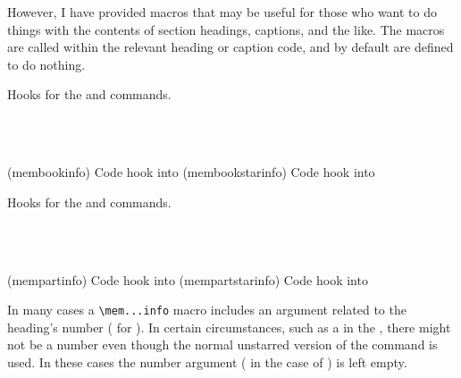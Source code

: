     However, I have provided macros that may be useful for those 
who want to do things with the contents of section headings, 
captions, and the like. The macros are called within the 
relevant heading or caption code, and by default are defined 
to do nothing.

    Hooks for the \cmd{\book} and \cmd{\book*} commands.
\begin{syntax}
\cmd{\membookinfo} \\
\cmd{\membookstarinfo} \\
\end{syntax}
\glossary(membookinfo)%
  {}%
  {Code hook into }%
\glossary(membookstarinfo)%
  {}%
  {Code hook into }%


    Hooks for the \cmd{\part} and \cmd{\part*} commands.
\begin{syntax}
\cmd{\mempartinfo} \\
\cmd{\mempartstarinfo} \\
\end{syntax}
\glossary(mempartinfo)%
  {}%
  {Code hook into }%
\glossary(mempartstarinfo)%
  {}%
  {Code hook into }%

   In many cases a \verb?\mem...info? macro includes an argument
related to the heading's number ( for \cmd{\mempartinfo}). In certain circumstances, such as a \cmd{\chapter} in the
\cmd{\frontmatter}, there might not be a number even though the
normal unstarred version of the command is used. In these cases
the number argument ( in the case of
\cmd{\memchapinfo}) is left empty.

